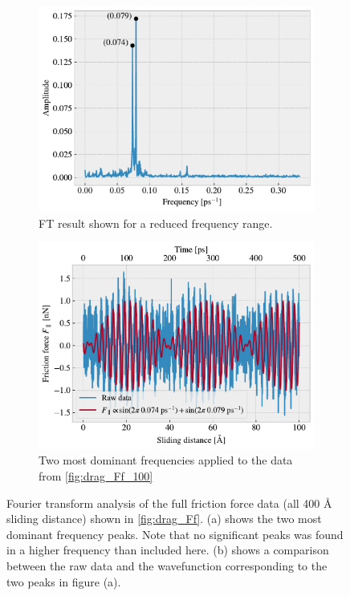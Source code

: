 \begin{figure}[H]
  \centering
  \begin{subfigure}[t]{0.49\textwidth}
    \centering
    \includegraphics[width=\textwidth]{figures/baseline/ft_zoom.pdf}
    \caption{FT result shown for a reduced frequency range.}
    \label{fig:ft_a}
  \end{subfigure}
  \hfill
  \begin{subfigure}[t]{0.49\textwidth}
      \centering
      \includegraphics[width=\textwidth]{figures/baseline/ft_sine.pdf}
      \caption{Two most dominant frequencies applied to the data from \cref{fig:drag_Ff_100}}
      \label{fig:ft_b}
  \end{subfigure}
  \caption{Fourier transform analysis of the full friction force data (all 400 Å sliding distance) shown in \cref{fig:drag_Ff}. (a) shows the two most dominant frequency peaks. Note that no significant peaks was found in a higher frequency than included here. (b) shows a comparison between the raw data and the wavefunction corresponding to the two peaks in figure (a).}
  \label{fig:ft}
\end{figure}


